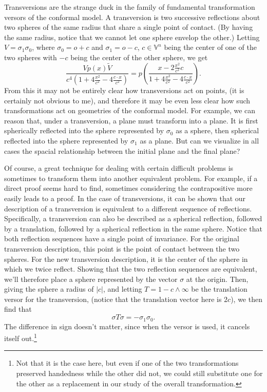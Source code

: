 \documentclass[12pt]{article}
\newcommand{\V}{\mathbb{V}}
\newcommand{\nvao}{o}
\newcommand{\nvai}{\infty}
\begin{document}
Transversions are the strange duck in the family of fundamental
transformation versors of the conformal model.  A transversion is two
successive reflections about two spheres of the same radius that share a single point
of contact.  (By having the same radius, notice that we cannot let one sphere
envelop the other.)
Letting $V=\sigma_1\sigma_0$, where $\sigma_0=\nvao+c$
and $\sigma_1=\nvao-c$, $c\in\V^n$ being the center of one of the two spheres
with $-c$ being the center of the other sphere, we get
\begin{equation*}
\frac{Vp(x)\tilde{V}}{c^4(1+4\frac{x^2}{c^2}-4\frac{c\cdot x}{c^2})}
= p\left(\frac{x-2\frac{x^2}{c^2}c}{1+4\frac{x^2}{c^2}-4\frac{c\cdot x}{c^2}}\right).
\end{equation*}
From this it may not be entirely clear how transversions act
on points, (it is certainly not obvious to me), and therefore it may be even less clear how such transformations
act on geometries of the conformal model.  For example, we can reason
that, under a transversion, a plane must transform into a plane.  It is
first spherically reflected into the sphere represented by $\sigma_0$
as a sphere, then spherical reflected into the sphere represented by $\sigma_1$
as a plane.  But can we visualize in all cases the spacial relationship between
the initial plane and the final plane?

Of course, a great technique for dealing with certain difficult problems is sometimes
to transform them into another equivalent problem.  For example, if a direct proof seems hard to find,
sometimes considering the contrapositive more easily leads to a proof.  In the case
of transversions, it can be shown that our description of a transversion is equivalent
to a different sequence of reflections.  Specifically, a transversion can also be described
as a spherical reflection, followed by a translation, followed by a spherical reflection
in the same sphere.  Notice that both reflection sequences have a single
point of invariance.  For the original transversion description, this point is the
point of contact between the two spheres.  For the new transversion description,
it is the center of the sphere in which we twice reflect.  Showing that the two
reflection sequences are equivalent, we'll therefore place a sphere represented
by the vector $\sigma$ at the origin.  Then, giving the sphere a radius of $|c|$,
and letting $T=1-c\wedge\nvai$ be the translation versor for the transversion, (notice that the translation
vector here is $2c$), we then find that
\begin{equation*}
\sigma T\sigma = -\sigma_1\sigma_0.
\end{equation*}
The difference in sign doesn't matter, since when the versor is used, it cancels itself
out.\footnote{Not that it is the case here, but even if one of the two transformations preserved
handedness while the other did not, we could still substitute one for the other as a replacement
in our study of the overall transformation.}
\end{document}
